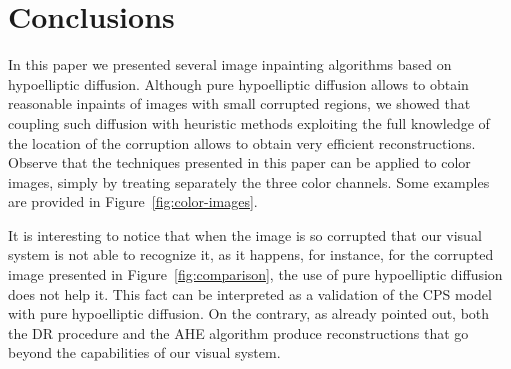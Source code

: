 \documentclass[proc]{edpsmath}
\begin{document}
\section{Conclusions}

In this paper we presented several image inpainting algorithms based on hypoelliptic diffusion. Although pure hypoelliptic diffusion allows to obtain reasonable inpaints of images with small corrupted regions, we showed that coupling such diffusion with heuristic methods exploiting the full knowledge of the location of the corruption allows to obtain very efficient reconstructions. 
Observe that the techniques presented in this paper can be applied to color images, simply by treating separately the three color channels. Some examples are provided in Figure~\ref{fig:color-images}.

It is interesting to notice that when the image is so corrupted that our visual system is not able to recognize it, as it happens, for instance, for the corrupted image presented in Figure~\ref{fig:comparison}, the use of pure hypoelliptic diffusion does not help it.
This fact can be interpreted as a validation of the CPS model with pure hypoelliptic diffusion. On the contrary, as already pointed out, both the DR procedure and the AHE algorithm produce reconstructions that go beyond the capabilities of our visual system.



\end{document}
